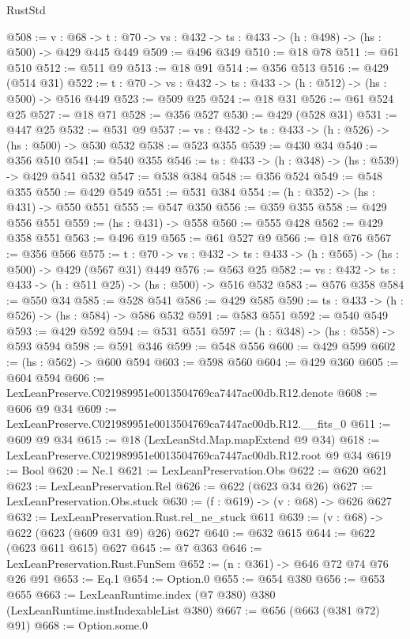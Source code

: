\begin{lexlean}{RustStd}
\begin{coremodule}
@508 := {v : @68} ->
  {t : @70} -> {vs : @432} -> {ts : @433} -> (h : @498) -> (hs : @500) -> @429 @445 @449
@509 := @496 @349
@510 := @18 @78
@511 := @61 @510
@512 := @511 @9
@513 := @18 @91
@514 := @356 @513
@516 := @429 (@514 @31)
@522 := {t : @70} -> {vs : @432} -> {ts : @433} -> (h : @512) -> (hs : @500) -> @516 @449
@523 := @509 @25
@524 := @18 @31
@526 := @61 @524 @25
@527 := @18 @71
@528 := @356 @527
@530 := @429 (@528 @31)
@531 := @447 @25
@532 := @531 @9
@537 := {vs : @432} -> {ts : @433} -> (h : @526) -> (hs : @500) -> @530 @532
@538 := @523 @355
@539 := @430 @34
@540 := @356 @510
@541 := @540 @355
@546 := {ts : @433} -> (h : @348) -> (hs : @539) -> @429 @541 @532
@547 := @538 @384
@548 := @356 @524
@549 := @548 @355
@550 := @429 @549
@551 := @531 @384
@554 := (h : @352) -> (hs : @431) -> @550 @551
@555 := @547 @350
@556 := @359 @355
@558 := @429 @556 @551
@559 := (hs : @431) -> @558
@560 := @555 @428
@562 := @429 @358 @551
@563 := @496 @19
@565 := @61 @527 @9
@566 := @18 @76
@567 := @356 @566
@575 := {t : @70} -> {vs : @432} -> {ts : @433} -> (h : @565) -> (hs : @500) -> @429 (@567 @31) @449
@576 := @563 @25
@582 := {vs : @432} -> {ts : @433} -> (h : @511 @25) -> (hs : @500) -> @516 @532
@583 := @576 @358
@584 := @550 @34
@585 := @528 @541
@586 := @429 @585
@590 := {ts : @433} -> (h : @526) -> (hs : @584) -> @586 @532
@591 := @583 @551
@592 := @540 @549
@593 := @429 @592
@594 := @531 @551
@597 := (h : @348) -> (hs : @558) -> @593 @594
@598 := @591 @346
@599 := @548 @556
@600 := @429 @599
@602 := (hs : @562) -> @600 @594
@603 := @598 @560
@604 := @429 @360
@605 := @604 @594
@606 := LexLeanPreserve.C021989951e0013504769ca7447ac00db.R12.denote
@608 := @606 @9 @34
@609 := LexLeanPreserve.C021989951e0013504769ca7447ac00db.R12.__fits_0
@611 := @609 @9 @34
@615 := @18 (LexLeanStd.Map.mapExtend @9 @34)
@618 := LexLeanPreserve.C021989951e0013504769ca7447ac00db.R12.root @9 @34
@619 := Bool
@620 := Ne.{1}
@621 := LexLeanPreservation.Obs
@622 := @620 @621
@623 := LexLeanPreservation.Rel
@626 := @622 (@623 @34 @26)
@627 := LexLeanPreservation.Obs.stuck
@630 := (f : @619) -> (v : @68) -> @626 @627
@632 := LexLeanPreservation.Rust.rel_ne_stuck @611
@639 := (v : @68) -> @622 (@623 (@609 @31 @9) @26) @627
@640 := @632 @615
@644 := @622 (@623 @611 @615) @627
@645 := @7 @363
@646 := LexLeanPreservation.Rust.FunSem
@652 := (n : @361) -> @646 @72 @74 @76 @26 @91
@653 := Eq.{1}
@654 := Option.{0}
@655 := @654 @380
@656 := @653 @655
@663 := LexLeanRuntime.index (@7 @380) @380 (LexLeanRuntime.instIndexableList @380)
@667 := @656 (@663 (@381 @72) @91)
@668 := Option.some.{0}

\end{coremodule}
\end{lexlean}
